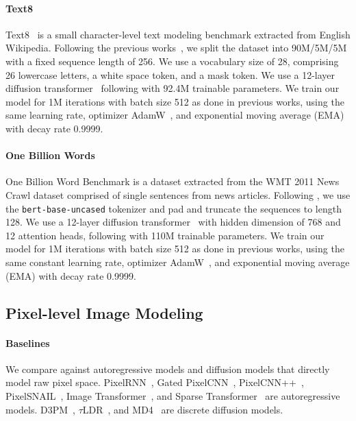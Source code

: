 \paragraph{Text8} \label{app:exp:text8}
Text8~\citep{data_text8} is a small character-level text modeling benchmark extracted from English Wikipedia.
Following the previous works~\citep{austin2021d3pm,lou2024sedd,sahoo2024simple}, we split the dataset into 90M/5M/5M with a fixed sequence length of 256.
We use a vocabulary size of 28, comprising 26 lowercase letters, a white space token, and a mask token.
We use a 12-layer diffusion transformer~\citep{peebles2023dit} following \citet{lou2024sedd} with 92.4M trainable parameters. 
We train our model for 1M iterations with batch size 512 as done in previous works, using the same learning rate, optimizer AdamW~\citep{loshchilov17adamw}, and exponential moving average (EMA) with decay rate 0.9999. 


\paragraph{One Billion Words} \label{app:exp:lm1b}
One Billion Word Benchmark is a dataset extracted from the WMT 2011 News Crawl dataset
comprised of single sentences from news articles.
Following \citet{sahoo2024simple}, we use the \texttt{bert-base-uncased} tokenizer and pad and truncate the sequences to length 128.
We use a 12-layer diffusion transformer~\citep{peebles2023dit} with hidden dimension of 768 and 12 attention heads, following \citet{sahoo2024simple} with 110M trainable parameters. 
We train our model for 1M iterations with batch size 512 as done in previous works, using the same constant learning rate, optimizer AdamW~\citep{loshchilov17adamw}, and exponential moving average (EMA) with decay rate 0.9999. 


\subsection{Pixel-level Image Modeling} \label{app:exp:image}

\paragraph{Baselines}
We compare against autoregressive models and diffusion models that directly model raw pixel space. 
PixelRNN~\citep{oord2016pixel}, Gated PixelCNN~\citep{oord2016gated}, PixelCNN++~\citep{salimans2017pixel}, PixelSNAIL~\citep{chen2018pixelsnail}, Image Transformer~\citep{parmar2018image}, and Sparse Transformer~\citep{child2019sparse} are autoregressive models.
D3PM~\citep{austin2021d3pm}, $\tau$LDR~\citep{campbell2022ctmc}, and MD4~\citep{shi2024md4} are discrete diffusion models.


